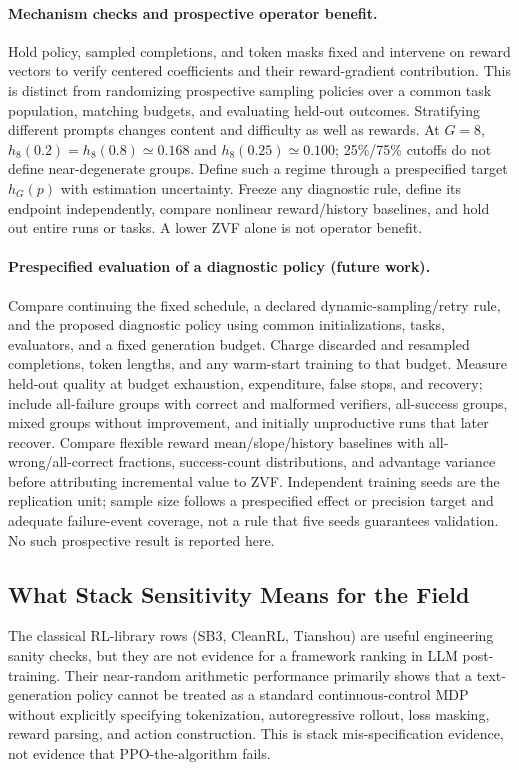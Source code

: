 \paragraph{Mechanism checks and prospective operator benefit.}
Hold policy, sampled completions, and token masks fixed and intervene on reward
vectors to verify centered coefficients and their reward-gradient contribution.
This is distinct from randomizing prospective sampling policies over a common
task population, matching budgets, and evaluating held-out outcomes.
Stratifying different prompts changes content and difficulty as well as rewards.
At $G=8$, $h_8(0.2)=h_8(0.8)\simeq0.168$ and $h_8(0.25)\simeq0.100$;
25\%/75\% cutoffs do not define near-degenerate groups. Define such a regime
through a prespecified target $h_G(p)$ with estimation uncertainty.
Freeze any diagnostic rule, define its endpoint independently, compare nonlinear
reward/history baselines, and hold out entire runs or tasks. A lower ZVF alone
is not operator benefit.

\paragraph{Prespecified evaluation of a diagnostic policy (future work).}
Compare continuing the fixed schedule, a declared dynamic-sampling/retry rule,
and the proposed diagnostic policy using common initializations, tasks,
evaluators, and a fixed generation budget. Charge discarded and resampled
completions, token lengths, and any warm-start training to that budget.
Measure held-out quality at budget exhaustion, expenditure, false stops, and
recovery; include all-failure groups with correct and malformed verifiers,
all-success groups, mixed groups without improvement, and initially
unproductive runs that later recover. Compare flexible reward mean/slope/history
baselines with all-wrong/all-correct fractions, success-count distributions,
and advantage variance before attributing incremental value to ZVF.
Independent training seeds are the replication unit; sample size follows a
prespecified effect or precision target and adequate failure-event coverage,
not a rule that five seeds guarantees validation. No such prospective result
is reported here.


\subsection{What Stack Sensitivity Means for the Field}
\label{sec:discuss_impl}

The classical RL-library rows (SB3, CleanRL, Tianshou) are useful engineering
sanity checks, but they are not evidence for a framework ranking in LLM
post-training.  Their near-random arithmetic performance primarily shows that
a text-generation policy cannot be treated as a standard continuous-control
MDP without explicitly specifying tokenization, autoregressive rollout,
loss masking, reward parsing, and action construction.  This is stack
mis-specification evidence, not evidence that PPO-the-algorithm fails.

